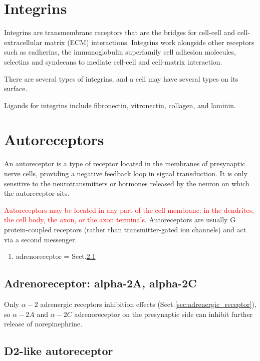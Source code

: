 \section{Integrins}
\label{sec:integrins}

Integrins are transmembrane receptors that are the bridges for cell-cell and
cell-extracellular matrix (ECM) interactions.
Integrins work alongside other receptors such as cadherins, the immunoglobulin
superfamily cell adhesion molecules, selectins and syndecans to mediate
cell-cell and cell-matrix interaction.

There are several types of integrins, and a cell may have several types on its
surface. 

Ligands for integrins include fibronectin, vitronectin, collagen, and laminin.

\section{Autoreceptors}
\label{sec:autoreceptors}

An autoreceptor is a type of receptor located in the membranes of presynaptic
nerve cells, providing a negative feedback loop in signal transduction.
It is only sensitive to the neurotransmitters or hormones released by the
neuron on which the autoreceptor sits. 

\textcolor{red}{Autoreceptors may be located in any part of the cell membrane:
in the dendrites, the cell body, the axon, or the axon terminals}.
Autoreceptors are usually G protein-coupled receptors (rather than
transmitter-gated ion channels) and act via a second messenger.

\begin{enumerate}
  \item adrenoreceptor = Sect.\ref{sec:adrenoreceptor}
\end{enumerate}

\subsection{Adrenoreceptor: alpha-2A, alpha-2C}
\label{sec:adrenoreceptor}

Only $\alpha-2$ adrenergic receptors inhibition effects
(Sect.\ref{sec:adrenergic_receptor}), so $\alpha-2A$  and $\alpha-2C$
adrenoreceptor on the presynaptic side can inhibit further release of
norepinephrine.

\subsection{D2-like autoreceptor}
\label{sec:D2-like-autoreceptor}


